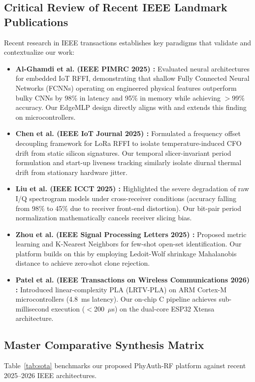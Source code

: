 \documentclass[11pt,a4paper]{article}
\begin{document}
\subsection{Critical Review of Recent IEEE Landmark Publications}
Recent research in IEEE transactions establishes key paradigms that validate and contextualize our work:
\begin{itemize}\setlength\itemsep{0.1em}
    \item \textbf{Al-Ghamdi et al. (IEEE PIMRC 2025) \cite{alghamdi2025}:} Evaluated neural architectures for embedded IoT RFFI, demonstrating that shallow Fully Connected Neural Networks (FCNNs) operating on engineered physical features outperform bulky CNNs by 98\% in latency and 95\% in memory while achieving $>$99\% accuracy. Our EdgeMLP design directly aligns with and extends this finding on microcontrollers.
    \item \textbf{Chen et al. (IEEE IoT Journal 2025) \cite{chen2025}:} Formulated a frequency offset decoupling framework for LoRa RFFI to isolate temperature-induced CFO drift from static silicon signatures. Our temporal slicer-invariant period formulation and start-up liveness tracking similarly isolate diurnal thermal drift from stationary hardware jitter.
    \item \textbf{Liu et al. (IEEE ICCT 2025) \cite{liu2025}:} Highlighted the severe degradation of raw I/Q spectrogram models under cross-receiver conditions (accuracy falling from 98\% to 45\% due to receiver front-end distortion). Our bit-pair period normalization mathematically cancels receiver slicing bias.
    \item \textbf{Zhou et al. (IEEE Signal Processing Letters 2025) \cite{zhou2025}:} Proposed metric learning and K-Nearest Neighbors for few-shot open-set identification. Our platform builds on this by employing Ledoit-Wolf shrinkage Mahalanobis distance to achieve zero-shot clone rejection.
    \item \textbf{Patel et al. (IEEE Transactions on Wireless Communications 2026) \cite{patel2026}:} Introduced linear-complexity PLA (LRTV-PLA) on ARM Cortex-M microcontrollers (4.8~ms latency). Our on-chip C pipeline achieves sub-millisecond execution ($<$200~$\mu$s) on the dual-core ESP32 Xtensa architecture.
\end{itemize}

\subsection{Master Comparative Synthesis Matrix}
Table~\ref{tab:sota} benchmarks our proposed PhyAuth-RF platform against recent 2025--2026 IEEE architectures.
\end{document}
